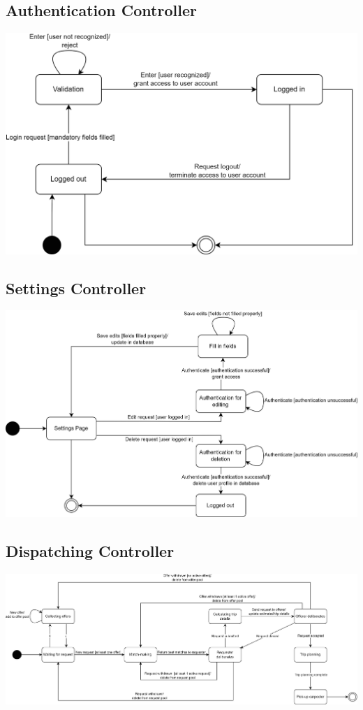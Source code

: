 \documentclass[]{article}
\begin{document}
\subsection*{Authentication Controller}
\includegraphics{StateCharts/Authentication.png}

\subsection*{Settings Controller}
\includegraphics[scale=0.85]{StateCharts/Settings.png}

\subsection*{Dispatching Controller}
\includegraphics[scale=0.6]{StateCharts/Dispatcher.png}
\end{document}
